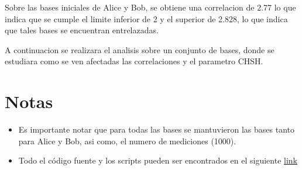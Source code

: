 \documentclass[11pt]{article}
\begin{document}
Sobre las bases iniciales de Alice y Bob, se obtiene una correlacion de 2.77 lo que indica que se cumple el limite inferior de 2 y el superior de 2.828, lo que indica que tales bases se encuentran entrelazadas.

A continuacion se realizara el analisis sobre un conjunto de bases, donde se estudiara como se ven afectadas las correlaciones y el parametro CHSH.

\section{Notas}
\begin{itemize}
    \item Es importante notar que para todas las bases se mantuvieron las bases tanto para Alice y Bob, asi como, el numero de mediciones (1000).
    \item Todo el código fuente y los scripts pueden ser encontrados en el siguiente \href{https://github.com/LukasWolff2002/TAREA_5_QM}{link}
\end{itemize}
\end{document}
